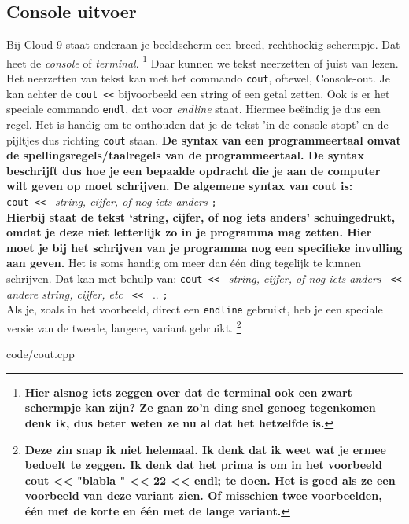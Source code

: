 \documentclass[12pt,a4paper]{article}
\newcommand{\code}{}
\newcommand{\icode}{\lstinline}
\begin{document}
\subsection{Console uitvoer}
Bij Cloud 9 staat onderaan je beeldscherm een breed, rechthoekig schermpje. Dat heet de \emph{console} of \emph{terminal}. \footnote{\textbf{Hier alsnog iets zeggen over dat de terminal ook een zwart schermpje kan zijn? Ze gaan zo'n ding snel genoeg tegenkomen denk ik, dus beter weten ze nu al dat het hetzelfde is.}} Daar kunnen we tekst neerzetten of juist van lezen. Het neerzetten van tekst kan met het commando \icode{cout}, oftewel, Console-out. Je kan achter de \icode{cout <<} bijvoorbeeld een string of een getal zetten. Ook is er het speciale commando \icode{endl}, dat voor \emph{endline} staat. Hiermee be\"eindig je dus een regel. Het is handig om te onthouden dat je de tekst 'in de console stopt' en de pijltjes dus richting \icode{cout} staan. \textbf{De syntax van een programmeertaal omvat de spellingsregels/taalregels van de programmeertaal. De syntax beschrijft dus hoe je een bepaalde opdracht die je aan de computer wilt geven op moet schrijven. De algemene syntax van cout is:}\\
\icode{cout << } \emph{string, cijfer, of nog iets anders} \icode{;}\\
\textbf{Hierbij staat de tekst `string, cijfer, of nog iets anders' schuingedrukt, omdat je deze niet letterlijk zo in je programma mag zetten. Hier moet je bij het schrijven van je programma nog een specifieke invulling aan geven.} Het is soms handig om meer dan \'e\'en ding tegelijk te kunnen schrijven. Dat kan met behulp van:
\icode{cout << } \emph{string, cijfer, of nog iets anders} \icode{ << } \emph{andere string, cijfer, etc} \icode{ << } .. \icode{;}\\
Als je, zoals in het voorbeeld, direct een \icode{endline} gebruikt, heb je een speciale versie van de tweede, langere, variant gebruikt. \footnote{\textbf{Deze zin snap ik niet helemaal. Ik denk dat ik weet wat je ermee bedoelt te zeggen. Ik denk dat het prima is om in het voorbeeld cout << "blabla " << 22 << endl; te doen. Het is goed als ze een voorbeeld van deze variant zien. Of misschien twee voorbeelden, één met de korte en één met de lange variant.}}

\code{code/cout.cpp}
\end{document}
